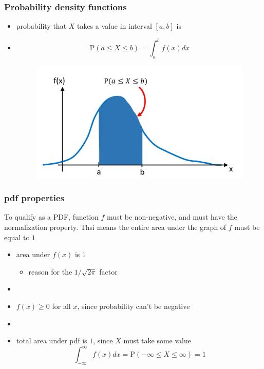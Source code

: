 \documentclass[english,14pt]{beamer}
\begin{document}

\begin{frame}[fragile]

\frametitle{Probability density functions}

\begin{itemize}
\item probability that $X$ takes a value in interval $[a,b]$ is
	\item[] \[
\mathrm{P}(a \leq X \leq b) = \int_a^b f(x) dx
\]
\begin{figure}[ht]
	\centering
	\includegraphics[width=.7\textwidth]{figures/genericPDF}
\end{figure}

\end{itemize}

\end{frame}


\begin{frame}[fragile]

\frametitle{pdf properties}

To qualify as a PDF, function $f$ must be non-negative, and must have the normalization property. Thsi means the entire area under the graph of $f$ must be equal to $1$

\begin{itemize}
	\item area under $f(x)$ is $1$
	\begin{itemize}
		\item reason for the $1/\sqrt{2\pi}$ factor
	\end{itemize}
	
	\item[]
	
	\item $f(x) \geq 0$ for all $x$, since probability can't be negative
	
	\item[]
	
	\item total area under pdf is $1$, since $X$ must take some value
\[
\int_{-\infty}^\infty f(x) dx = \mathrm{P}(-\infty \leq X \leq \infty) = 1
\]
\end{itemize}

\end{frame}
\end{document}
